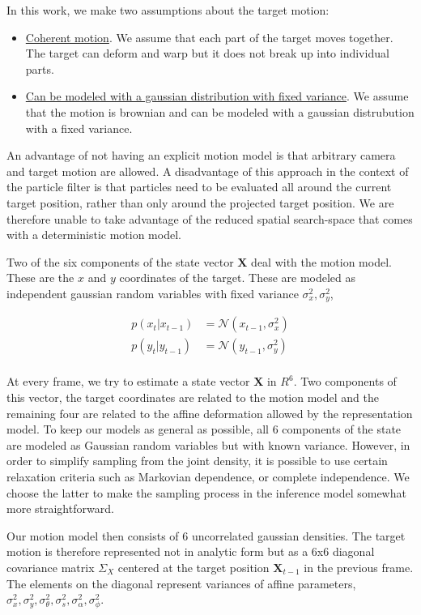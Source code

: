 In this work, we make two assumptions about the target motion:

\begin{itemize}
\item \underline{Coherent motion}.  We assume that each part of the target moves together.  The target can deform and warp but it does not break up into individual parts.
\item \underline{Can be modeled with a gaussian distribution with fixed variance}.  We assume that the motion is brownian and can be modeled with a gaussian distrubution with a fixed variance.  
\end{itemize}

An advantage of not having an explicit motion model is that arbitrary camera and target motion are allowed.  A disadvantage of this approach in the context of the particle filter is that particles need to be evaluated all around the current target position, rather than only around the projected target position.  We are therefore unable to take advantage of the reduced spatial search-space that comes with a deterministic motion model.  

Two of the six components of the state vector $\mathbf{X}$ deal with the motion model.  These are the $x$ and $y$ coordinates of the target.  These are modeled as independent gaussian random variables with fixed variance $\sigma_x^2, \sigma_y^2$,

\begin{align*}
p(x_t|x_{t-1}) &= \mathcal{N}(x_{t-1}, \sigma_x^2) \\
p(y_t|y_{t-1}) &= \mathcal{N}(y_{t-1}, \sigma_y^2) \\
\end{align*}

\newpage
At every frame, we try to estimate a state vector $\mathbf{X}$ in $R^6$.  Two components of this vector, the target coordinates are related to the motion model and the remaining four are related to the affine deformation allowed by the representation model.  To keep our models as general as possible, all 6 components of the state are modeled as Gaussian random variables but with known variance.  However, in order to simplify sampling from the joint density, it is possible to use certain relaxation criteria such as Markovian dependence, or complete independence.  We choose the latter to make the sampling process in the inference model somewhat more straightforward.

Our motion model then consists of 6 uncorrelated gaussian densities. 
The target motion is therefore represented not in analytic form but as a 6x6 diagonal covariance matrix $\Sigma_X$ centered at the target position $\mathbf{X}_{t-1}$ in the previous frame.  The elements on the diagonal represent variances of affine parameters, $\sigma_x^2, \sigma_y^2, \sigma_\theta^2, \sigma_s^2, \sigma_\alpha^2, \sigma_\phi^2$.   


